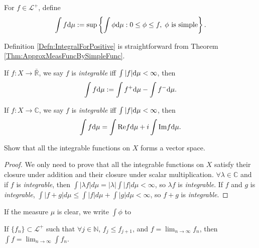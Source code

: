 \begin{defn}
    \label{Defn:IntegralForPositive}
    For $f\in \mathcal{L}^{+}$, define 
    \begin{displaymath}
        \int f\mathrm{d}\mu:=\sup\left\{\int\phi\mathrm{d}\mu:0\le\phi\le f,
        \;\phi\text{ is simple}\right\}.
    \end{displaymath}
\end{defn}
\begin{rem}
    Definition \ref{Defn:IntegralForPositive} is straightforward 
    from Theorem \ref{Thm:ApproxMeasFuncBySimpleFunc}.
\end{rem}
\begin{defn}
    \label{Defn:RealValuedFuncInt}
    If $f:X\rightarrow\bar{\mathbb{R}}$, we say 
    $f$ is \textit{integrable} iff $\int|f|\mathrm{d}\mu<\infty$, 
    then 
    \begin{displaymath}
        \int f\mathrm{d}\mu:=\int f^{+}\mathrm{d}\mu-\int f^{-}\mathrm{d}\mu.
    \end{displaymath}
\end{defn}
\begin{defn}
    \label{Defn:ComplexValuedFuncInt}
    If $f:X\rightarrow\mathbb{C}$, we say $f$ is \textit{integrable} 
    iff $\int|f|\mathrm{d}\mu<\infty$, then 
    \begin{displaymath}
        \int f\mathrm{d}\mu=\int \text{Re}f\mathrm{d}\mu+i\int\text{Im}f\mathrm{d}\mu.
    \end{displaymath}
\end{defn}
\begin{exc}
    Show that all the integrable 
    functions on $X$ forms a vector space.
\end{exc}
\begin{proof}
    We only need to prove that all the integrable 
    functions on $X$ satisfy their closure under addition
    and their closure under scalar multiplication. 
    $\forall \lambda\in\mathbb{C}$ and if $f$ 
    is \textit{integrable}, then 
    $\int|\lambda f|d\mu=|\lambda|\int|f|d\mu<\infty$,
    so $\lambda f$ is \textit{integrable}.
    If $f$ and $g$ is \textit{integrable},
    $\int|f+g|d\mu\leq\int|f|d\mu+\int|g|d\mu<\infty$,
    so $f+g$ is \textit{integrable}.
\end{proof}
\begin{ntn}
    If the measure $\mu$ is clear, 
    we write $\int\phi$ to 
\end{ntn}
\begin{thm}
    \label{Thm:MCT}
    If $\{f_{n}\}\subset\mathcal{L}^{+}$ such that 
    $\forall j\in\mathbb{N}$, $f_j\le f_{j+1}$, and 
    $f=\lim_{n\rightarrow\infty}f_{n}$, then 
    $\int f=\lim_{n\rightarrow\infty}\int f_n$.
\end{thm}
